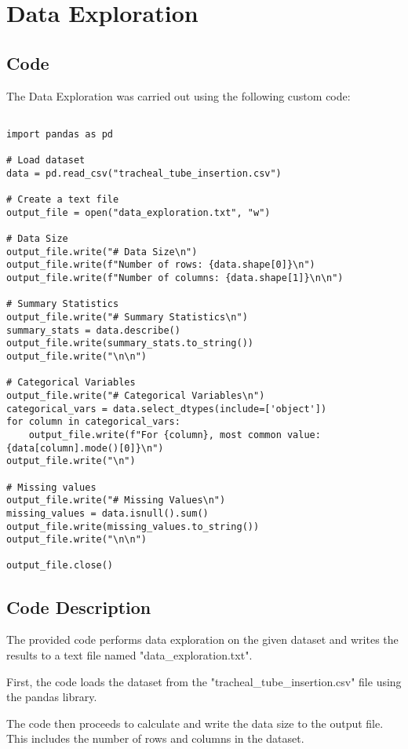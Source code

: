 \documentclass[11pt]{article}
\begin{document}
\section{Data Exploration}
\subsection{{Code}}
The Data Exploration was carried out using the following custom code:

\begin{verbatim}

import pandas as pd

# Load dataset
data = pd.read_csv("tracheal_tube_insertion.csv")

# Create a text file
output_file = open("data_exploration.txt", "w")

# Data Size
output_file.write("# Data Size\n")
output_file.write(f"Number of rows: {data.shape[0]}\n")
output_file.write(f"Number of columns: {data.shape[1]}\n\n")

# Summary Statistics
output_file.write("# Summary Statistics\n")
summary_stats = data.describe()
output_file.write(summary_stats.to_string())
output_file.write("\n\n")

# Categorical Variables
output_file.write("# Categorical Variables\n")
categorical_vars = data.select_dtypes(include=['object'])
for column in categorical_vars:
    output_file.write(f"For {column}, most common value: {data[column].mode()[0]}\n")
output_file.write("\n")

# Missing values
output_file.write("# Missing Values\n")
missing_values = data.isnull().sum()
output_file.write(missing_values.to_string())
output_file.write("\n\n")

output_file.close()

\end{verbatim}

\subsection{Code Description}

The provided code performs data exploration on the given dataset and writes the results to a text file named "data\_exploration.txt". 

First, the code loads the dataset from the "tracheal\_tube\_insertion.csv" file using the pandas library.

The code then proceeds to calculate and write the data size to the output file. This includes the number of rows and columns in the dataset.
\end{document}
